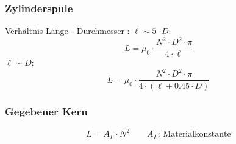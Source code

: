 \subsubsection{Zylinderspule}
Verhältnis Länge - Durchmesser : $\ell \sim 5 \cdot D$:
\[ L = \mu_0 \cdot \frac{N^2 \cdot D^2 \cdot \pi}{4 \cdot \ell} \]
$\ell \sim D$:
\[ L = \mu_0 \cdot \frac{N^2 \cdot D^2 \cdot \pi}{4 \cdot (\ell + 0.45 \cdot D)} \]

\subsubsection{Gegebener Kern}
\[ L = A_L \cdot N^2 \qquad \text{$A_L$: Materialkonstante} \]